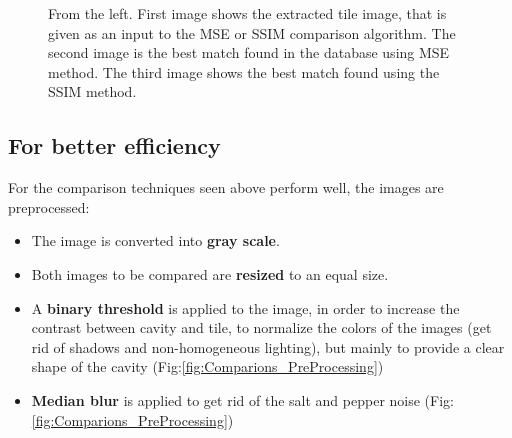 \documentclass{article}
\begin{document}
\begin{figure}[h!]
\caption{From the left. First image shows the extracted tile image, that is given as an input to the MSE or SSIM comparison algorithm. The second image is the best match found in the database using MSE method. The third image shows the best match found using the SSIM method.}
\label{fig:Comparions_result}

\end{figure}

\subsection*{For better efficiency}
For the comparison techniques seen above perform well, the images are preprocessed:
\begin{itemize}
\item The image is converted into \textbf{gray scale}. 
\item Both images to be compared are \textbf{resized} to an equal size.
\item A \textbf{binary threshold} is applied to the image, in order to increase the contrast between cavity and tile, to normalize the colors of the images (get rid of shadows and non-homogeneous lighting), but mainly to provide a clear shape of the cavity (Fig:\ref{fig:Comparions_PreProcessing})
\item \textbf{Median blur} is applied to get rid of the salt and pepper noise (Fig:\ref{fig:Comparions_PreProcessing})
\end{itemize}
\end{document}
